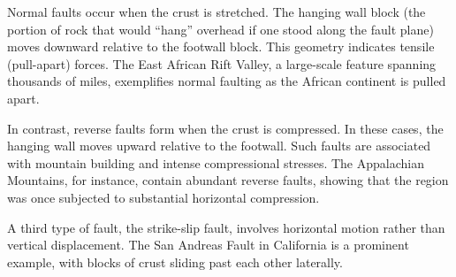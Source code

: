 \documentclass{article}
\begin{document}
Normal faults occur when the crust is stretched. The hanging wall block (the portion of rock that would “hang” overhead if one stood along the fault plane) moves downward relative to the footwall block. This geometry indicates tensile (pull-apart) forces. The East African Rift Valley, a large-scale feature spanning thousands of miles, exemplifies normal faulting as the African continent is pulled apart.

In contrast, reverse faults form when the crust is compressed. In these cases, the hanging wall moves upward relative to the footwall. Such faults are associated with mountain building and intense compressional stresses. The Appalachian Mountains, for instance, contain abundant reverse faults, showing that the region was once subjected to substantial horizontal compression.

A third type of fault, the strike-slip fault, involves horizontal motion rather than vertical displacement. The San Andreas Fault in California is a prominent example, with blocks of crust sliding past each other laterally.
\end{document}
